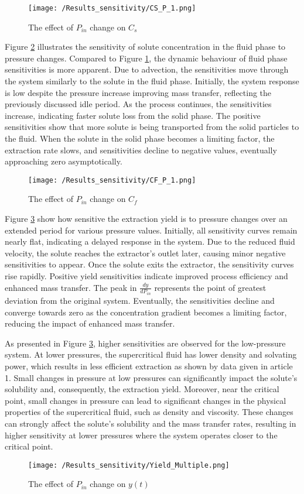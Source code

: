 \documentclass[../Article_Sensitivity_Analsysis.tex]{subfiles}
\begin{document}
	\begin{figure}[!ht]
		\centering
		\texttt{[image: /Results\_sensitivity/CS\_P\_1.png]}
		\caption{The effect of $P_{in}$ change on $C_s$}
		\label{fig:Sensitivty_P_CS}
	\end{figure}

	Figure \ref{fig:Sensitivty_P_CF} illustrates the sensitivity of solute concentration in the fluid phase to pressure changes. Compared to Figure \ref{fig:Sensitivty_P_CS}, the dynamic behaviour of fluid phase sensitivities is more apparent. Due to advection, the sensitivities move through the system similarly to the solute in the fluid phase.	Initially, the system response is low despite the pressure increase improving mass transfer, reflecting the previously discussed idle period. As the process continues, the sensitivities increase, indicating faster solute loss from the solid phase. The positive sensitivities show that more solute is being transported from the solid particles to the fluid. When the solute in the solid phase becomes a limiting factor, the extraction rate slows, and sensitivities decline to negative values, eventually approaching zero asymptotically.
	
	\begin{figure}[!ht]
		\centering
		\texttt{[image: /Results\_sensitivity/CF\_P\_1.png]}
		\caption{The effect of $P_{in}$ change on $C_f$}
		\label{fig:Sensitivty_P_CF}
	\end{figure}
	
	Figure \ref{fig:Sensitivty_P_y} show how sensitive the extraction yield is to pressure changes over an extended period for various pressure values. Initially, all sensitivity curves remain nearly flat, indicating a delayed response in the system. Due to the reduced fluid velocity, the solute reaches the extractor's outlet later, causing minor negative sensitivities to appear. Once the solute exits the extractor, the sensitivity curves rise rapidly. Positive yield sensitivities indicate improved process efficiency and enhanced mass transfer. The peak in $\frac{dy}{dP_{in}}$ represents the point of greatest deviation from the original system. Eventually, the sensitivities decline and converge towards zero as the concentration gradient becomes a limiting factor, reducing the impact of enhanced mass transfer.
	
	As presented in Figure \ref{fig:Sensitivty_P_y}, higher sensitivities are observed for the low-pressure system. At lower pressures, the supercritical fluid has lower density and solvating power, which results in less efficient extraction as shown by data given in {\color{red}article 1}. Small changes in pressure at low pressures can significantly impact the solute's solubility and, consequently, the extraction yield. Moreover, near the critical point, small changes in pressure can lead to significant changes in the physical properties of the supercritical fluid, such as density and viscosity. These changes can strongly affect the solute's solubility and the mass transfer rates, resulting in higher sensitivity at lower pressures where the system operates closer to the critical point.
	
	\begin{figure}[!ht]
		\centering
		\texttt{[image: /Results\_sensitivity/Yield\_Multiple.png]}
		\caption{The effect of $P_{in}$ change on $y(t)$}
		\label{fig:Sensitivty_P_y}
	\end{figure}
		
\end{document}
